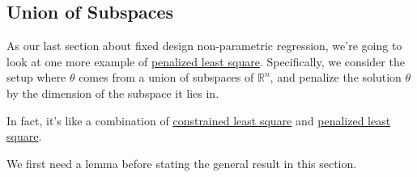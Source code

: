 \subsection{Union of Subspaces}
As our last section about fixed design non-parametric regression, we're going to look at one more example of \hyperref[prb:penalized-LS]{penalized least square}. Specifically, we consider the setup where \(\theta \) comes from a union of subspaces of \(\mathbb{R} ^n\), and penalize the solution \(\theta \) by the dimension of the subspace it lies in.

\begin{intuition}
	In fact, it's like a combination of \hyperref[prb:constrained-LS]{constrained least square} and \hyperref[prb:penalized-LS]{penalized least square}.
\end{intuition}

We first need a lemma before stating the general result in this section.

